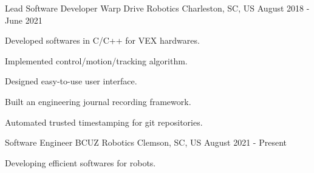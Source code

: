 

\begin{cventries}

  \cventry
    {Lead Software Developer} %
    {Warp Drive Robotics} %
    {Charleston, SC, US} %
    {August 2018 - June 2021} %
    {
      \begin{cvitems} %
        \item {Developed softwares in C/C++ for VEX hardwares.}
        \item {Implemented control/motion/tracking algorithm.}
        \item {Designed easy-to-use user interface.}
        \item {Built an engineering journal recording framework.}
        \item {Automated trusted timestamping for git repositories.}
      \end{cvitems}
    }

  \cventry
    {Software Engineer} %
    {BCUZ Robotics} %
    {Clemson, SC, US} %
    {August 2021 - Present} %
    {
      \begin{cvitems} %
        \item {Developing efficient softwares for robots.}
      \end{cvitems}
    }

\end{cventries}
